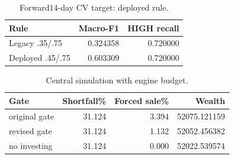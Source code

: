 \begin{table}[t]\centering
\caption{Forward14-day CV target: deployed rule.}
\begin{tabular}{lrr}\toprule
Rule & Macro-F1 & HIGH recall \\\midrule
Legacy .35/.75 & 0.324358 & 0.720000 \\
Deployed .45/.75 & 0.603309 & 0.720000 \\
\bottomrule\end{tabular}\end{table}
\begin{table}[t]\centering
\caption{Central simulation with engine budget.}
\begin{tabular}{lrrr}\toprule
Gate & Shortfall\% & Forced sale\% & Wealth \\\midrule
original gate & 31.124 & 3.394 & 52075.121159 \\
revised gate & 31.124 & 1.132 & 52052.456382 \\
no investing & 31.124 & 0.000 & 52022.539574 \\
\bottomrule\end{tabular}\end{table}
\begin{table}[t]\centering
\caption{Health outcome diagnostics.}
\end{table}
\begin{table}[t]\centering
\caption{Allocator enumeration.}
\end{table}
